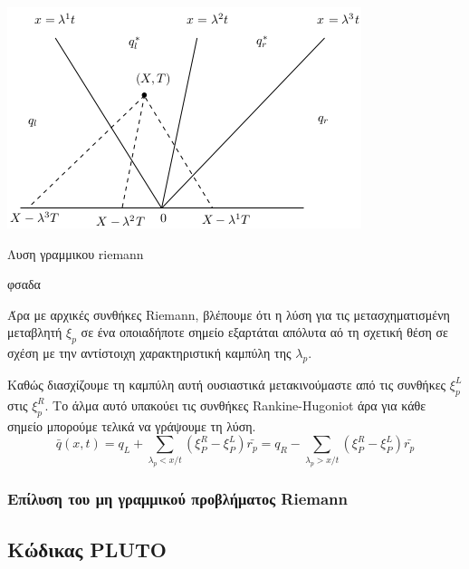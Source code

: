 \begin{marginfigure}
	\label{fig:linearriemann-leveque}
	\centering
	\includegraphics[width=1\linewidth]{Images/LinearRiemann-leveque}
	\caption{Λυση γραμμικου riemann}
\end{marginfigure}

φσαδα 

Άρα με αρχικές συνθήκες Riemann, βλέπουμε ότι η λύση για τις μετασχηματισμένη μεταβλητή $\xi _p$ σε ένα οποιαδήποτε σημείο εξαρτάται απόλυτα αό τη σχετική θέση σε σχέση με την αντίστοιχη χαρακτηριστική καμπύλη της $\lambda _p$.  

Καθώς διασχίζουμε τη καμπύλη αυτή ουσιαστικά μετακινούμαστε από τις συνθήκες $\xi^L_p$ στις $\xi^R_p$. Το άλμα αυτό υπακούει τις συνθήκες Rankine-Hugoniot  άρα για κάθε σημείο μπορούμε τελικά να γράψουμε τη λύση.
\begin{equation}
\bar{q}(x,t)=q_L + \sum_{\lambda_p<x/t} (\xi ^R_P - \xi ^L_P) \bar{r_p}
			=q_R - \sum_{\lambda_p>x/t} (\xi ^R_P - \xi ^L_P) \bar{r_p}
\end{equation}

\subsubsection{Επίλυση του μη γραμμικού προβλήματος Riemann}


\subsection{Κώδικας PLUTO}

